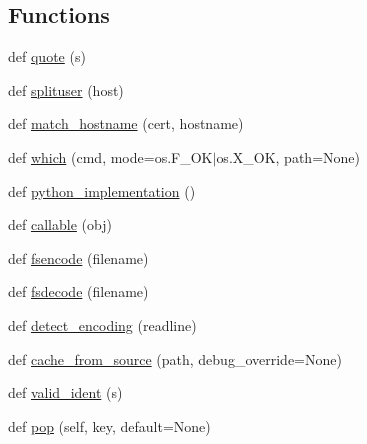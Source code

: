 \subsection*{Functions}
\begin{DoxyCompactItemize}
\item 
def \hyperlink{namespacepip_1_1__vendor_1_1distlib_1_1compat_adf4817930ecc4f1170d9417fea7a0888}{quote} (s)
\item 
def \hyperlink{namespacepip_1_1__vendor_1_1distlib_1_1compat_a5bd4032f7f78becd62395ad062b03799}{splituser} (host)
\item 
def \hyperlink{namespacepip_1_1__vendor_1_1distlib_1_1compat_abf4e1c36582952fa1e927dab6dba79f3}{match\+\_\+hostname} (cert, hostname)
\item 
def \hyperlink{namespacepip_1_1__vendor_1_1distlib_1_1compat_a800db4b1ec9d36807734094873595462}{which} (cmd, mode=os.\+F\+\_\+\+OK$\vert$os.\+X\+\_\+\+OK, path=None)
\item 
def \hyperlink{namespacepip_1_1__vendor_1_1distlib_1_1compat_a9481e554a0a451f3f833a7f2d001dc57}{python\+\_\+implementation} ()
\item 
def \hyperlink{namespacepip_1_1__vendor_1_1distlib_1_1compat_a5b90c9e8af4976df2da5d6bd857268cd}{callable} (obj)
\item 
def \hyperlink{namespacepip_1_1__vendor_1_1distlib_1_1compat_a1036cda476b9db50a58e1a40aafe71ff}{fsencode} (filename)
\item 
def \hyperlink{namespacepip_1_1__vendor_1_1distlib_1_1compat_a8026e7add59e22fd94278d3b20c98c84}{fsdecode} (filename)
\item 
def \hyperlink{namespacepip_1_1__vendor_1_1distlib_1_1compat_aed2f37d8c934bb151e40db13748be067}{detect\+\_\+encoding} (readline)
\item 
def \hyperlink{namespacepip_1_1__vendor_1_1distlib_1_1compat_ab5d2e81943c5fe462bf1252c99ed5f41}{cache\+\_\+from\+\_\+source} (path, debug\+\_\+override=None)
\item 
def \hyperlink{namespacepip_1_1__vendor_1_1distlib_1_1compat_a15c6b03186b57cb92e6f58cdac400641}{valid\+\_\+ident} (s)
\item 
def \hyperlink{namespacepip_1_1__vendor_1_1distlib_1_1compat_af2de87d4eb4e5f0c5107ef23aeeb40fa}{pop} (self, key, default=None)
\end{DoxyCompactItemize}
